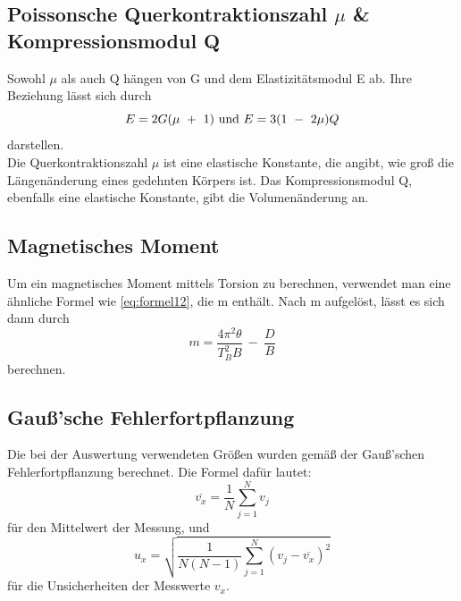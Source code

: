 \subsection{Poissonsche Querkontraktionszahl \texorpdfstring{$\mu$}{mu} \& Kompressionsmodul Q}
Sowohl $\mu$ als auch Q hängen von G und dem Elastizitätsmodul E ab.
Ihre Beziehung lässt sich durch
\begin{equation}
    E = 2G(\mu\ +\ 1)\\
    \
    \textrm{und}\\
    \
    E = 3(1\ -\ 2\mu)Q
\end{equation}
darstellen.\\
Die Querkontraktionszahl $\mu$ ist eine elastische Konstante, die angibt, wie groß die Längenänderung eines gedehnten Körpers ist.
Das Kompressionsmodul Q, ebenfalls eine elastische Konstante, gibt die Volumenänderung an.\\
\subsection{Magnetisches Moment}
Um ein magnetisches Moment mittels Torsion zu berechnen, verwendet man eine ähnliche Formel wie \autoref{eq:formel12}, die m enthält.
Nach m aufgelöst, lässt es sich dann durch
\begin{equation}
    m = \frac{4\pi^2\theta}{T_B^2B}\ -\ \frac{D}{B}
    \label{eq:formel13}
\end{equation}
berechnen.
\subsection{Gauß'sche Fehlerfortpflanzung}
Die bei der Auswertung verwendeten Größen wurden gemäß der Gauß'schen Fehlerfortpflanzung berechnet.
Die Formel dafür lautet:
\begin{equation}
    \overline{v_x}=\frac{1}{N} \sum_{j=1}^N v_j
\end{equation}
für den Mittelwert der Messung, und
\begin{equation}
    u_x = \sqrt{\frac{1}{N(N-1)} \sum_{j=1}^N (v_j-\overline{v_x})^2}
\end{equation}
für die Unsicherheiten der Messwerte $v_x$.